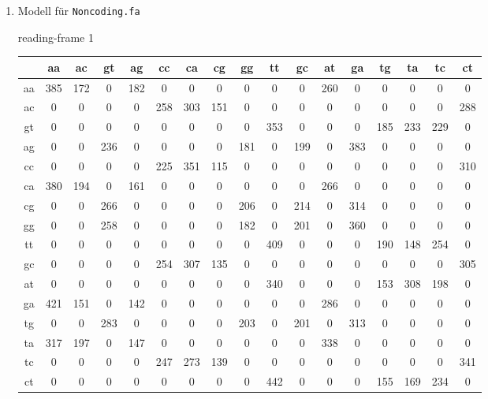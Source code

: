 \documentclass{homework}
\begin{document}
\begin{enumerate}
\begin{enumerate}
\item Modell für \texttt{Noncoding.fa}

reading-frame 1
\tiny

\begin{tabular}{c|cccccccccccccccc}
   & aa & ac & gt & ag & cc & ca & cg & gg & tt & gc & at & ga & tg & ta & tc & ct\\\hline
aa & 385 & 172 &   0 & 182 &   0 &   0 &   0 &   0 &   0 &   0 & 260 &   0 &   0 &   0 &   0 &   0\\
ac &   0 &   0 &   0 &   0 & 258 & 303 & 151 &   0 &   0 &   0 &   0 &   0 &   0 &   0 &   0 & 288\\
gt &   0 &   0 &   0 &   0 &   0 &   0 &   0 &   0 & 353 &   0 &   0 &   0 & 185 & 233 & 229 &   0\\
ag &   0 &   0 & 236 &   0 &   0 &   0 &   0 & 181 &   0 & 199 &   0 & 383 &   0 &   0 &   0 &   0\\
cc &   0 &   0 &   0 &   0 & 225 & 351 & 115 &   0 &   0 &   0 &   0 &   0 &   0 &   0 &   0 & 310\\
ca & 380 & 194 &   0 & 161 &   0 &   0 &   0 &   0 &   0 &   0 & 266 &   0 &   0 &   0 &   0 &   0\\
cg &   0 &   0 & 266 &   0 &   0 &   0 &   0 & 206 &   0 & 214 &   0 & 314 &   0 &   0 &   0 &   0\\
gg &   0 &   0 & 258 &   0 &   0 &   0 &   0 & 182 &   0 & 201 &   0 & 360 &   0 &   0 &   0 &   0\\
tt &   0 &   0 &   0 &   0 &   0 &   0 &   0 &   0 & 409 &   0 &   0 &   0 & 190 & 148 & 254 &   0\\
gc &   0 &   0 &   0 &   0 & 254 & 307 & 135 &   0 &   0 &   0 &   0 &   0 &   0 &   0 &   0 & 305\\
at &   0 &   0 &   0 &   0 &   0 &   0 &   0 &   0 & 340 &   0 &   0 &   0 & 153 & 308 & 198 &   0\\
ga & 421 & 151 &   0 & 142 &   0 &   0 &   0 &   0 &   0 &   0 & 286 &   0 &   0 &   0 &   0 &   0\\
tg &   0 &   0 & 283 &   0 &   0 &   0 &   0 & 203 &   0 & 201 &   0 & 313 &   0 &   0 &   0 &   0\\
ta & 317 & 197 &   0 & 147 &   0 &   0 &   0 &   0 &   0 &   0 & 338 &   0 &   0 &   0 &   0 &   0\\
tc &   0 &   0 &   0 &   0 & 247 & 273 & 139 &   0 &   0 &   0 &   0 &   0 &   0 &   0 &   0 & 341\\
ct &   0 &   0 &   0 &   0 &   0 &   0 &   0 &   0 & 442 &   0 &   0 &   0 & 155 & 169 & 234 &   0\\
\end{tabular}


\end{enumerate}
\end{enumerate}
\end{document}
